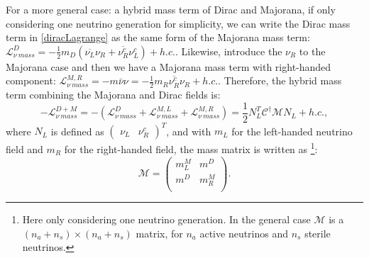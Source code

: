 For a more general case: a hybrid mass term of Dirac and Majorana, if only considering one neutrino generation for simplicity, we can write the Dirac mass term in \ref{diracLagrange} as the same form of the Majorana mass term: $\mathcal{L}_{\nu~mass}^D = -\frac{1}{2}m_D(\overline{\nu_L}\nu_R+\overline{\nu^c_R}\nu^c_L)+h.c.$. Likewise, introduce the $\nu_R$ to the Majorana case and then we have a Majorana mass term with right-handed component: $\mathcal{L}^{M,R}_{\nu~mass} = -m\bar{\nu}\nu=-\frac{1}{2}m_R\overline{\nu_R^c}\nu_R+h.c.$. Therefore, the hybrid mass term combining the Majorana and Dirac fields is\cite{akhmedov2014majorana,zuber1998physics}:
\begin{equation}\label{hybridmass}
-\mathcal{L}^{D+M}_{\nu~mass} = -(\mathcal{L}^{D}_{\nu~mass}+\mathcal{L}^{M,L}_{\nu~mass}+\mathcal{L}^{M,R}_{\nu~mass})=\frac{1}{2}N^T_L\mathcal{C}^\dagger
\mathcal{M}N_L+h.c.,
\end{equation}
where $N_L$ is defined as 
$\begin{pmatrix}\nu_L & \nu^c_R\end{pmatrix}^T$, 
and with $m_L$ for the left-handed neutrino field and $m_R$ for the right-handed field, the mass matrix is written as
\footnote{Here only considering one neutrino generation. In the general case $\mathcal M$ is a $(n_a+n_s)\times(n_a+n_s)$ matrix, for $n_a$ active neutrinos and $n_s$ sterile neutrinos\cite{zuber1998physics,akhmedov2014majorana}.}:
\begin{equation}
\mathcal M=
\begin{pmatrix}
	m_L^M &  m^D\\
	m^D &  m_R^M\\
\end{pmatrix}.
\end{equation}

